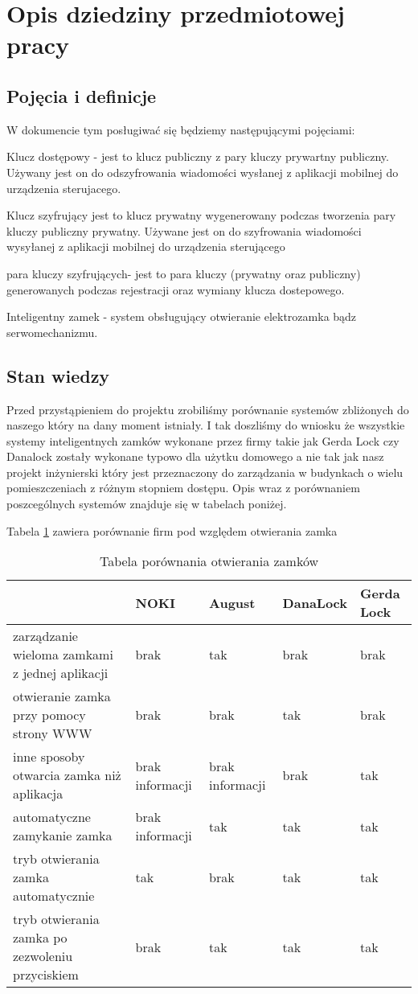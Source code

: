 % 
\newpage\section{Opis dziedziny przedmiotowej pracy}\label{sec:dziedzina}
\subsection{Pojęcia i definicje}
W dokumencie tym posługiwać się będziemy następującymi pojęciami:

Klucz dostępowy - jest to klucz publiczny z pary kluczy prywartny publiczny. Używany jest on do odszyfrowania wiadomości wysłanej z aplikacji mobilnej do urządzenia sterujacego.

Klucz szyfrujący jest to klucz prywatny wygenerowany podczas tworzenia pary kluczy publiczny prywatny. Używane jest on do szyfrowania wiadomości wysyłanej z aplikacji mobilnej do urządzenia sterującego

para kluczy szyfrujących- jest to para kluczy (prywatny oraz publiczny) generowanych podczas rejestracji oraz wymiany klucza dostepowego.

Inteligentny zamek - system obsługujący otwieranie elektrozamka bądz serwomechanizmu.
\subsection{Stan wiedzy}
Przed przystąpieniem do projektu zrobiliśmy porównanie systemów zbliżonych do naszego który na dany moment istniały. I tak doszliśmy do wniosku że wszystkie systemy inteligentnych zamków wykonane przez firmy takie jak Gerda Lock czy Danalock zostały wykonane typowo dla użytku domowego a nie tak jak nasz projekt inżynierski który jest przeznaczony do zarządzania w budynkach o wielu pomieszczeniach z różnym stopniem dostępu. Opis wraz z porównaniem poszcególnych systemów znajduje się w tabelach poniżej.


	Tabela \ref{tab:porownanie1} zawiera porównanie firm pod względem otwierania zamka
	\begin{longtable}[!ht]{|p{4cm}|p{}|p{}|p{}|p{}|} 
		\caption{Tabela porównania otwierania zamków}
		\label{tab:porownanie1}\\
		\hline	
		 & NOKI & August & DanaLock & Gerda Lock  \\	\hline
		 zarządzanie wieloma zamkami z jednej aplikacji
		 & brak & tak & brak & brak \\	\hline
		otwieranie zamka przy pomocy strony WWW
		& brak & brak & tak & brak \\	\hline
		inne sposoby otwarcia zamka niż aplikacja
		& brak informacji& brak informacji & brak & tak \\	\hline
		automatyczne zamykanie zamka
		& brak informacji& tak & tak & tak   \\	\hline
		tryb otwierania zamka automatycznie
		& tak& brak & tak & tak \\	\hline	
		tryb otwierania zamka po zezwoleniu przyciskiem
		& brak & tak & tak & tak \\		\hline
	\end{longtable}


